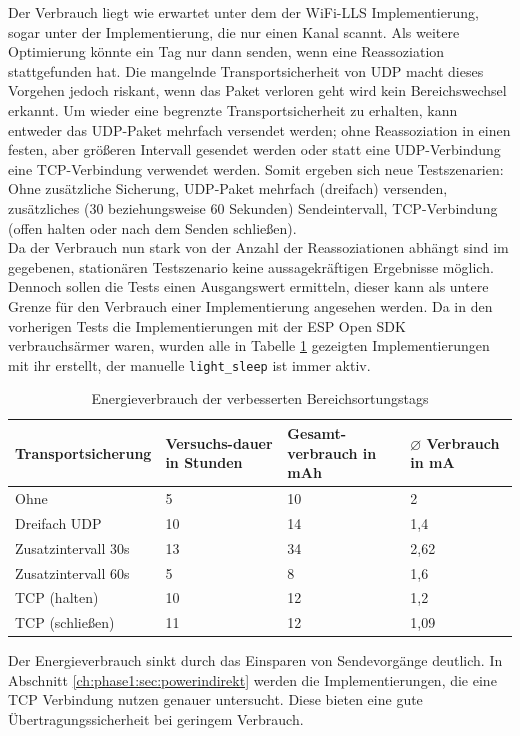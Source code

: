 Der Verbrauch liegt wie erwartet unter dem der WiFi-LLS Implementierung, sogar unter der Implementierung, die nur einen Kanal scannt.
Als weitere Optimierung könnte ein Tag nur dann senden, wenn eine Reassoziation stattgefunden hat.
Die mangelnde Transportsicherheit von UDP macht dieses Vorgehen jedoch riskant, wenn das Paket verloren geht wird kein Bereichswechsel erkannt.
Um wieder eine begrenzte Transportsicherheit zu erhalten, kann entweder das UDP-Paket mehrfach versendet werden; ohne Reassoziation in einen festen, aber größeren Intervall gesendet werden oder statt eine UDP-Verbindung eine TCP-Verbindung verwendet werden.
Somit ergeben sich neue Testszenarien: Ohne zusätzliche Sicherung, UDP-Paket mehrfach (dreifach) versenden, zusätzliches (30 beziehungsweise 60 Sekunden) Sendeintervall, TCP-Verbindung (offen halten oder nach dem Senden schließen). \\
Da der Verbrauch nun stark von der Anzahl der Reassoziationen abhängt sind im gegebenen, stationären Testszenario keine aussagekräftigen Ergebnisse möglich.
Dennoch sollen die Tests einen Ausgangswert ermitteln, dieser kann als untere Grenze für den Verbrauch einer Implementierung angesehen werden.
Da in den vorherigen Tests die Implementierungen mit der ESP Open SDK verbrauchsärmer waren, wurden alle in Tabelle \ref{table:naiveoptconsumption} gezeigten Implementierungen mit ihr erstellt, der manuelle \texttt{light\_sleep} ist immer aktiv.

\begin{table}[h]
	\centering
	\caption{Energieverbrauch der verbesserten Bereichsortungstags}
	\label{table:naiveoptconsumption}
	\begin{tabular}{p{3.5cm}|p{1.7cm}|p{2.5cm}|p{2.5cm}}
		Transportsicherung & Versuchs-dauer in Stunden & Gesamt-verbrauch in mAh & $\varnothing$ Verbrauch in mA \\
		\hline
		Ohne & 5 & 10 & 2 \\
		Dreifach UDP & 10 & 14 & 1,4 \\
		Zusatzintervall 30s & 13 & 34 & 2,62 \\
		Zusatzintervall 60s & 5 & 8 & 1,6 \\
		TCP (halten) & 10 & 12 & 1,2 \\
		TCP (schließen) & 11 & 12 & 1,09 \\
	\end{tabular}
\end{table}

Der Energieverbrauch sinkt durch das Einsparen von Sendevorgänge deutlich.
In Abschnitt \ref{ch:phase1:sec:powerindirekt} werden die Implementierungen, die eine TCP Verbindung nutzen genauer untersucht.
Diese bieten eine gute Übertragungssicherheit bei geringem Verbrauch.


